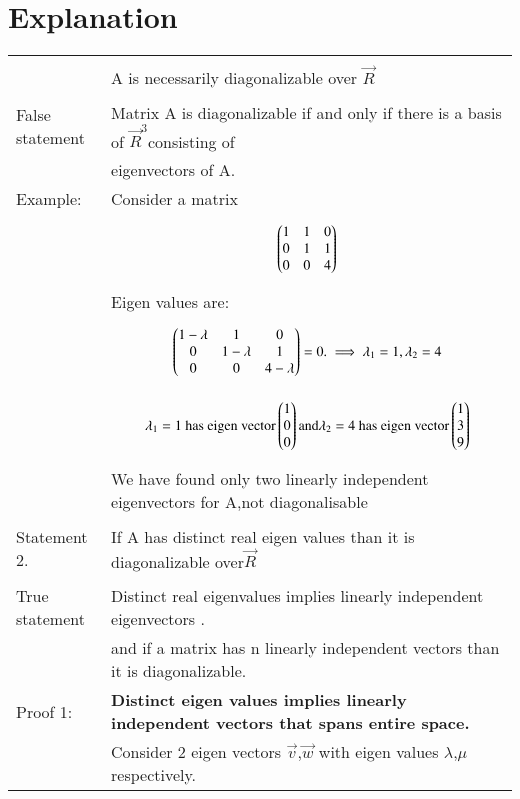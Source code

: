 \documentclass[journal,12pt]{IEEEtran}
\begin{document}
\section{\textbf{Explanation}}
\renewcommand{\thetable}{1}
\begin{longtable}{|l|l|}
\hline
\multirow{3}{*}{} & \\
Statement 1. & A  is necessarily diagonalizable over $\vec{R}$\\
\hline
& \\
False statement& Matrix A is diagonalizable if and only if there is a basis of $\vec{R}^3 $consisting of\\
& eigenvectors of A.\\
Example:&Consider a matrix\\&\parbox{12cm}{\begin{align}
 \begin{pmatrix}
1 &1 &0\\
0&1&1\\
0&0&4\end{pmatrix}\end{align}}\\
&Eigen values are:\\
&\parbox{12cm}{\begin{align}
 \begin{pmatrix}
1 -\lambda &1 &0\\
0&1-\lambda&1\\
0&0&4-\lambda\end{pmatrix}=0.
\implies\lambda_1=1,\lambda_2=4\end{align}}\\
&\parbox{12cm}{\begin{align}
  \lambda_1=1\text { has eigen vector}
 \begin{pmatrix}1\\0\\0\end{pmatrix} \text{and} 
  \lambda_2=4 \text{ has eigen vector}
\begin{pmatrix}1\\3\\9\end{pmatrix}
\end{align}}\\
 & We have found only two linearly independent eigenvectors for A,not diagonalisable
\\
\hline
\pagebreak
\hline
{}&\\
Statement 2. & If A has distinct real  eigen values
 than  it is diagonalizable over$\vec{R}$\\
\hline
&\\
True statement& Distinct real eigenvalues implies linearly independent eigenvectors .\\
& and if a matrix has n linearly independent vectors than it is  diagonalizable.\\
\hline
Proof  1:& \textbf{Distinct eigen values implies linearly independent vectors that spans entire space.}\\&Consider 2 eigen vectors $\vec{v}$,$\vec{w}$  with eigen values $\lambda$,$\mu$ respectively.\\

\end{longtable}
\end{document}
